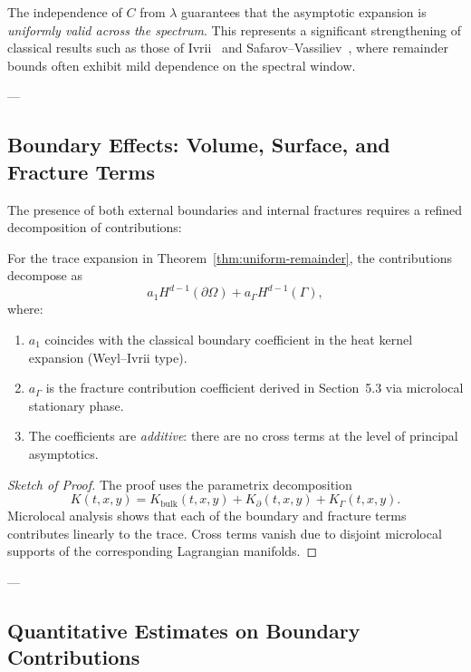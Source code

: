 \begin{remark}
The independence of $C$ from $\lambda$ guarantees that the asymptotic expansion 
is \emph{uniformly valid across the spectrum}. 
This represents a significant strengthening of classical results such as those of Ivrii~\cite{Ivrii2016} 
and Safarov--Vassiliev~\cite{SafarovVassiliev1997}, 
where remainder bounds often exhibit mild dependence on the spectral window.
\end{remark}

---

\subsection{Boundary Effects: Volume, Surface, and Fracture Terms}

The presence of both external boundaries and internal fractures 
requires a refined decomposition of contributions:

\begin{proposition}
\label{prop:boundary-decomposition}
For the trace expansion in Theorem~\ref{thm:uniform-remainder}, 
the contributions decompose as
\[
a_1 H^{d-1}(\partial\Omega) + a_\Gamma H^{d-1}(\Gamma),
\]
where:
\begin{enumerate}
  \item $a_1$ coincides with the classical boundary coefficient 
  in the heat kernel expansion (Weyl--Ivrii type).
  \item $a_\Gamma$ is the fracture contribution coefficient derived in Section~5.3 
  via microlocal stationary phase.
  \item The coefficients are \emph{additive}: there are no cross terms 
  at the level of principal asymptotics.
\end{enumerate}
\end{proposition}

\begin{proof}[Sketch of Proof]
The proof uses the parametrix decomposition 
\[
K(t,x,y) = K_{\mathrm{bulk}}(t,x,y) + K_{\partial}(t,x,y) + K_{\Gamma}(t,x,y).
\]
Microlocal analysis shows that each of the boundary and fracture terms 
contributes linearly to the trace.  
Cross terms vanish due to disjoint microlocal supports of the corresponding Lagrangian manifolds.
\end{proof}

---

\subsection{Quantitative Estimates on Boundary Contributions}

